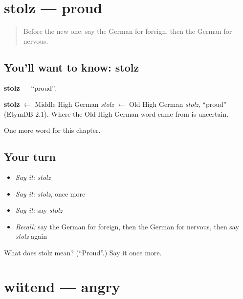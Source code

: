 \section[stolz]{stolz — proud}

\label{lesson:GE-C169-stolz}



\begin{quote}
Before the new one: say the German for foreign, then the German for nervous.
\end{quote}

\subsection*{You'll want to know: stolz}
\textbf{stolz} — \textquotedblleft{}proud\textquotedblright{}.

\begin{cousinweb}
\textbf{stolz} $\leftarrow$ Middle High German \emph{stolz} $\leftarrow$ Old High German \emph{stolz}, \textquotedblleft{}proud\textquotedblright{} (EtymDB 2.1). Where the Old High German word came from is uncertain.
\end{cousinweb}

\begin{grammarlens}[title={What you've built}]
One more word for this chapter.
\end{grammarlens}

\subsection*{Your turn}
\begin{itemize}
\raggedright
  \item \emph{Say it:} \emph{stolz}
  \item \emph{Say it:} \emph{stolz}, once more
  \item \emph{Say it:} say \emph{stolz}
  \item \emph{Recall:} say the German for foreign, then the German for nervous, then say \emph{stolz} again
\end{itemize}

\begin{tcolorbox}[breakable,colback=teal!4,colframe=teal!35!black,title={Before you move on}]
What does stolz mean? (\textquotedblleft{}Proud\textquotedblright{}.) Say it once more.
\end{tcolorbox}
\section[wütend]{wütend — angry}

